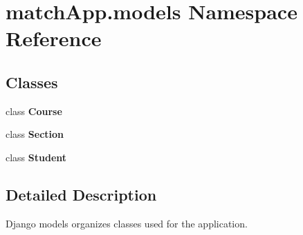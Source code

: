\section{match\+App.\+models Namespace Reference}
\label{namespacematch_app_1_1models}
\subsection*{Classes}
\begin{DoxyCompactItemize}
\item 
class {\bf Course}
\item 
class {\bf Section}
\item 
class {\bf Student}
\end{DoxyCompactItemize}


\subsection{Detailed Description}
\begin{DoxyVerb}Django models organizes classes used for the application. 
\end{DoxyVerb}
 